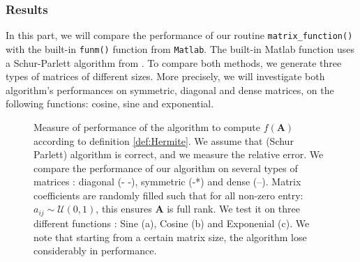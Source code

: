 \documentclass[11pt]{article}
\numberwithin{equation}{section}
\begin{document}
\subsubsection{Results}
In this part, we will compare the performance of our routine \texttt{matrix\_function()} with the built-in \texttt{funm()} function from \texttt{Matlab}. The built-in Matlab function uses a Schur-Parlett algorithm from \cite{davies2003schur}. To compare both methods, we generate three types of matrices of different sizes. More precisely, we will investigate both algorithm's performances on symmetric, diagonal and dense matrices, on the following functions: cosine, sine and exponential.
\begin{figure}
    \begin{subfigure}[b]{0.3\textwidth}
        
        \caption{}
        \label{fig:comp_sine}
    \end{subfigure}\hspace{.055\linewidth}
    \begin{subfigure}[b]{0.3\textwidth}
        
        \caption{}
        \label{fig:comp_cosine}
    \end{subfigure}\hspace{.025\linewidth}
    \begin{subfigure}[b]{0.3\textwidth}
        
        \caption{}
        \label{fig:comp_exp}
    \end{subfigure}
    \caption{Measure of performance of the algorithm to compute $f(\mathbf{A})$ according to definition \ref{def:Hermite}. We assume that \cite{davies2003schur} (Schur Parlett) algorithm is correct, and we measure the relative error. We compare the performance of our algorithm on several types of matrices : diagonal (- -), symmetric (-*) and dense (--). Matrix coefficients are randomly filled such that for all non-zero entry: $a_{ij}\sim\mathcal{U}(0,1)$, this ensures $\mathbf{A}$ is full rank. We test it on three different functions : Sine (a), Cosine (b) and Exponenial (c). We note that starting from a certain matrix size, the algorithm lose considerably in performance.}
    \label{fig:comp}
\end{figure}
\end{document}
